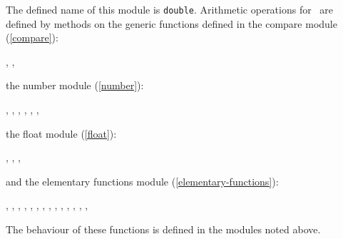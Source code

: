 \label{double-float}
%
\begin{optDefinition}
\noindent

The defined name of this module is {\tt double}.  Arithmetic operations for
\ are defined by methods on the generic functions defined
in the compare module (\ref{compare}):
%
\begin{flushleft}
    ,
    ,
\end{flushleft}
%
\noindent
the number module (\ref{number}):
%
\begin{flushleft}
    ,
    ,
    ,
    ,
    ,
    ,
\end{flushleft}
%
\noindent
the float module (\ref{float}):
\begin{flushleft}
,
,
,
\end{flushleft}
%
\noindent
and the elementary functions module (\ref{elementary-functions}):
\begin{flushleft}
,
,
,
,
,
,
,
,
,
,
,
,
,
,
\end{flushleft}
%
\noindent
The behaviour of these functions is defined in the modules noted
above.


\end{optDefinition}
